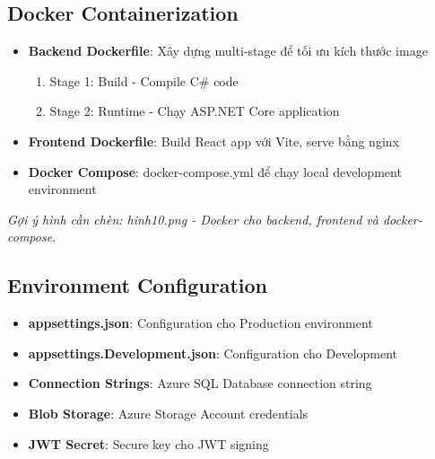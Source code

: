 \documentclass[a4paper]{article}
\begin{document}
    \subsection{Docker Containerization}
    \begin{itemize}
        \item \textbf{Backend Dockerfile}: Xây dựng multi-stage để tối ưu kích thước image
        \begin{enumerate}
            \item Stage 1: Build - Compile C\# code
            \item Stage 2: Runtime - Chạy ASP.NET Core application
        \end{enumerate}
        \item \textbf{Frontend Dockerfile}: Build React app với Vite, serve bằng nginx
        \item \textbf{Docker Compose}: docker-compose.yml để chạy local development environment
    \end{itemize}

    \textit{Gợi ý hình cần chèn: hinh10.png - Docker cho backend, frontend và docker-compose.}

    \subsection{Environment Configuration}
    \begin{itemize}
        \item \textbf{appsettings.json}: Configuration cho Production environment
        \item \textbf{appsettings.Development.json}: Configuration cho Development
        \item \textbf{Connection Strings}: Azure SQL Database connection string
        \item \textbf{Blob Storage}: Azure Storage Account credentials
        \item \textbf{JWT Secret}: Secure key cho JWT signing
    \end{itemize}
\end{document}
